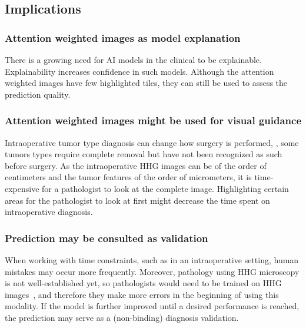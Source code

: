 \subsection{Implications}

\subsubsection{Attention weighted images as model explanation}
There is a growing need for AI models in the clinical to be explainable.
Explainability increases confidence in such models.
Although the attention weighted images have few highlighted tiles, they can still be used to assess the prediction quality.

\subsubsection{Attention weighted images might be used for visual guidance}
Intraoperative tumor type diagnosis can change how surgery is performed, \eg, some tumors types require complete removal but have not been recognized as such before surgery.
As the intraoperative HHG images can be of the order of centimeters and the tumor features of the order of micrometers, it is time-expensive for a pathologist to look at the complete image.
Highlighting certain areas for the pathologist to look at first might decrease the time spent on intraoperative diagnosis.

\subsubsection{Prediction may be consulted as validation}
When working with time constraints, such as in an intraoperative setting, human mistakes may occur more frequently.
Moreover, pathology using HHG microscopy is not well-established yet, so pathologists would need to be trained on HHG images~, and therefore they make more errors in the beginning of using this modality.
If the model is further improved until a desired performance is reached, the prediction may serve as a (non-binding) diagnosis validation.
